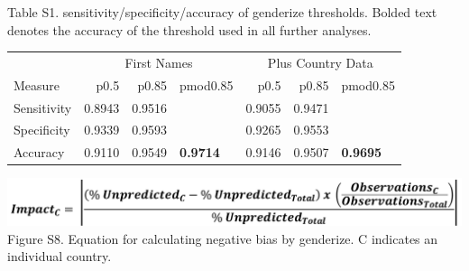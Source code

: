 \documentclass[11pt,]{article}
\begin{document}
\newpage

Table S1. sensitivity/specificity/accuracy of genderize thresholds.
Bolded text denotes the accuracy of the threshold used in all further
analyses.

\begin{table}[H]
\centering
\begin{tabular}{l|r|r|l|r|r|l}
\hline
\multicolumn{1}{c|}{ } & \multicolumn{3}{c|}{First Names} & \multicolumn{3}{c}{Plus Country Data} \\
\cline{2-4} \cline{5-7}
Measure & p0.5 & p0.85 & pmod0.85 & p0.5 & p0.85 & pmod0.85\\
\hline
Sensitivity & 0.8943 & 0.9516 & \cellcolor{white}{0.971} & 0.9055 & 0.9471 & \cellcolor{white}{0.9669}\\
\hline
Specificity & 0.9339 & 0.9593 & \cellcolor{white}{0.972} & 0.9265 & 0.9553 & \cellcolor{white}{0.9727}\\
\hline
Accuracy & 0.9110 & 0.9549 & \textbf{0.9714} & 0.9146 & 0.9507 & \textbf{0.9695}\\
\hline
\end{tabular}
\end{table}

\vspace{40mm}

\includegraphics{impact_equation.png} Figure S8. Equation for
calculating negative bias by genderize. C indicates an individual
country.

\newpage
\end{document}
